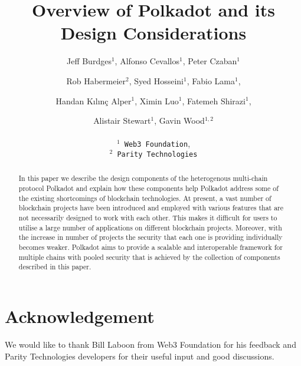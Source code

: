 \documentclass{article}
\title{Overview of Polkadot and its Design Considerations}
\author{
  Jeff Burdges$^1$, Alfonso Cevallos$^1$, Peter Czaban$^1$\\
  \and
  Rob Habermeier$^2$, Syed Hosseini$^1$, Fabio Lama$^1$,\\
  \and
  Handan K{\i}l{\i}n\c{c} Alper$^1$, Ximin Luo$^1$, Fatemeh Shirazi$^1$, \\
  \and
  Alistair Stewart$^1$, Gavin Wood$^{1,2}$\\
  \\
  \texttt{$^1$ Web3 Foundation},\\
  \texttt{$^2$ Parity Technologies}
}
\begin{document}
\maketitle

\begin{abstract}
In this paper we describe the design components of the heterogenous multi-chain protocol Polkadot and explain how these components help Polkadot address some of the existing shortcomings of blockchain technologies.
At present, a vast number of blockchain projects have been introduced and employed with various features that are not necessarily designed to work  with each other.  This makes it difficult for users to utilise a large number of applications on different blockchain projects. Moreover, with the increase in number of projects the security that each one is providing individually becomes weaker.
Polkadot aims to provide a scalable and interoperable framework for multiple chains with pooled security that is achieved by the collection of components described in this paper.
\end{abstract}

\tableofcontents
\newpage



%

%

\section*{Acknowledgement}
We would like to thank Bill Laboon from Web3 Foundation for his feedback and Parity Technologies developers for their useful input and good discussions.


\begin{appendix}

\end{appendix}
\end{document}
